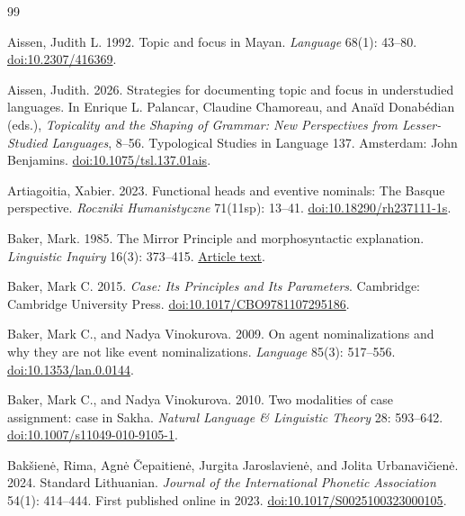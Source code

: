 \begingroup
\renewcommand{\bibname}{References}
\begin{thebibliography}{99}

Aissen, Judith L. 1992.
Topic and focus in Mayan.
\textit{Language} 68(1): 43--80.
\href{https://doi.org/10.2307/416369}{doi:10.2307/416369}.

Aissen, Judith. 2026.
Strategies for documenting topic and focus in understudied languages.
In Enrique L. Palancar, Claudine Chamoreau, and Anaïd Donabédian (eds.),
\textit{Topicality and the Shaping of Grammar: New Perspectives from
Lesser-Studied Languages}, 8--56.
Typological Studies in Language 137. Amsterdam: John Benjamins.
\href{https://doi.org/10.1075/tsl.137.01ais}{doi:10.1075/tsl.137.01ais}.

Artiagoitia, Xabier. 2023.
Functional heads and eventive nominals: The Basque perspective.
\textit{Roczniki Humanistyczne} 71(11sp): 13--41.
\href{https://doi.org/10.18290/rh237111-1s}{doi:10.18290/rh237111-1s}.

Baker, Mark. 1985.
The Mirror Principle and morphosyntactic explanation.
\textit{Linguistic Inquiry} 16(3): 373--415.
\href{https://brucehayes.org/205/Readings/Baker1985MirrorPrinciple.pdf}{Article text}.

Baker, Mark C. 2015.
\textit{Case: Its Principles and Its Parameters}.
Cambridge: Cambridge University Press.
\href{https://doi.org/10.1017/CBO9781107295186}{doi:10.1017/CBO9781107295186}.

Baker, Mark C., and Nadya Vinokurova. 2009.
On agent nominalizations and why they are not like event nominalizations.
\textit{Language} 85(3): 517--556.
\href{https://doi.org/10.1353/lan.0.0144}{doi:10.1353/lan.0.0144}.

Baker, Mark C., and Nadya Vinokurova. 2010.
Two modalities of case assignment: case in Sakha.
\textit{Natural Language \& Linguistic Theory} 28: 593--642.
\href{https://doi.org/10.1007/s11049-010-9105-1}{doi:10.1007/s11049-010-9105-1}.

Bak\v{s}ien\.e, Rima, Agn\.e \v{C}epaitien\.e, Jurgita Jaroslavien\.e,
and Jolita Urbanavi\v{c}ien\.e. 2024.
Standard Lithuanian.
\textit{Journal of the International Phonetic Association} 54(1): 414--444.
First published online in 2023.
\href{https://doi.org/10.1017/S0025100323000105}{doi:10.1017/S0025100323000105}.


\end{thebibliography}

